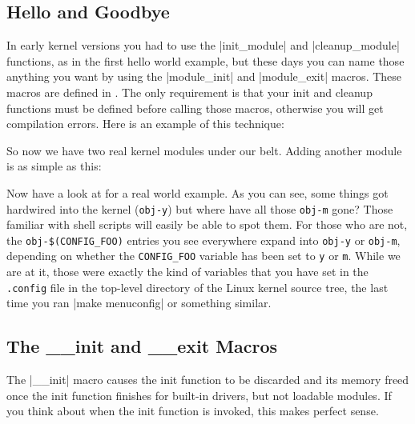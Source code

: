 \documentclass[10pt, oneside]{book}
\begin{document}
\subsection{Hello and Goodbye}
\label{hello_n_goodbye}
In early kernel versions you had to use the \cpp|init_module| and \cpp|cleanup_module| functions, as in the first hello world example, but these days you can name those anything you want by using the \cpp|module_init| and \cpp|module_exit| macros.
These macros are defined in .
The only requirement is that your init and cleanup functions must be defined before calling those macros, otherwise you will get compilation errors.
Here is an example of this technique:


So now we have two real kernel modules under our belt. Adding another module is as simple as this:


Now have a look at  for a real world example.
As you can see, some things got hardwired into the kernel (\verb|obj-y|) but where have all those \verb|obj-m| gone?
Those familiar with shell scripts will easily be able to spot them.
For those who are not, the \verb|obj-$(CONFIG_FOO)| entries you see everywhere expand into \verb|obj-y| or \verb|obj-m|, depending on whether the \verb|CONFIG_FOO| variable has been set to \verb|y| or \verb|m|.
While we are at it, those were exactly the kind of variables that you have set in the \verb|.config| file in the top-level directory of the Linux kernel source tree, the last time you ran \sh|make menuconfig| or something similar.

\subsection{The \_\_init and \_\_exit Macros}
\label{init_n_exit}
The \cpp|__init| macro causes the init function to be discarded and its memory freed once the init function finishes for built-in drivers, but not loadable modules.
If you think about when the init function is invoked, this makes perfect sense.
\end{document}
